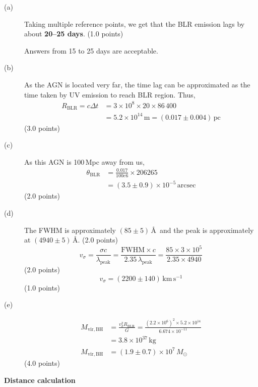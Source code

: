 \begin{description}
\item[(a)] Taking multiple reference points, we get that the BLR emission
  lags by about \textbf{20--25 days}. \hfill(1.0 points)

  Answers from 15 to 25 days are acceptable.

\item[(b)] As the AGN is located very far, the time lag can be approximated
  as the time taken by UV emission to reach BLR region. Thus,
  \begin{align*}
    R_{\mathrm{BLR}} = c\Delta t
      &= 3\times 10^{8}\times 20\times 86\,400 \\
      &= 5.2\times 10^{14}\,\mathrm{m} = (0.017\pm 0.004)\,\mathrm{pc}
  \end{align*}
  \hfill(3.0 points)

\item[(c)] As this AGN is 100\,Mpc away from us,
  \begin{align*}
    \theta_{\mathrm{BLR}} &= \frac{0.017}{100e6}\times 206265 \\
      &= (3.5\pm 0.9)\times 10^{-5}\,\mathrm{arcsec}
  \end{align*}
  \hfill(2.0 points)

\item[(d)] The FWHM is approximately $(85\pm 5)$\,\AA\ and the peak is
  approximately at $(4940\pm 5)$\,\AA. \hfill(2.0 points)
  \[ v_\sigma = \frac{\sigma c}{\lambda_{\mathrm{peak}}}
     = \frac{\mathrm{FWHM}\times c}{2.35\,\lambda_{\mathrm{peak}}}
     = \frac{85\times 3\times 10^{5}}{2.35\times 4940} \]
  \hfill(2.0 points)
  \[ v_\sigma = (2200\pm 140)\,\mathrm{km\,s^{-1}} \]
  \hfill(1.0 points)

\item[(e)] \mbox{}
  \begin{align*}
    M_{\mathrm{vir,BH}} &= \frac{v_\sigma^2 R_{\mathrm{BLR}}}{G}
      = \frac{(2.2\times 10^{6})^2\times 5.2\times 10^{14}}
             {6.674\times 10^{-11}} \\
      &= 3.8\times 10^{37}\,\mathrm{kg} \\
    M_{\mathrm{vir,BH}} &= (1.9\pm 0.7)\times 10^{7}\,M_\odot
  \end{align*}
  \hfill(4.0 points)
\end{description}

\textbf{Distance calculation}

